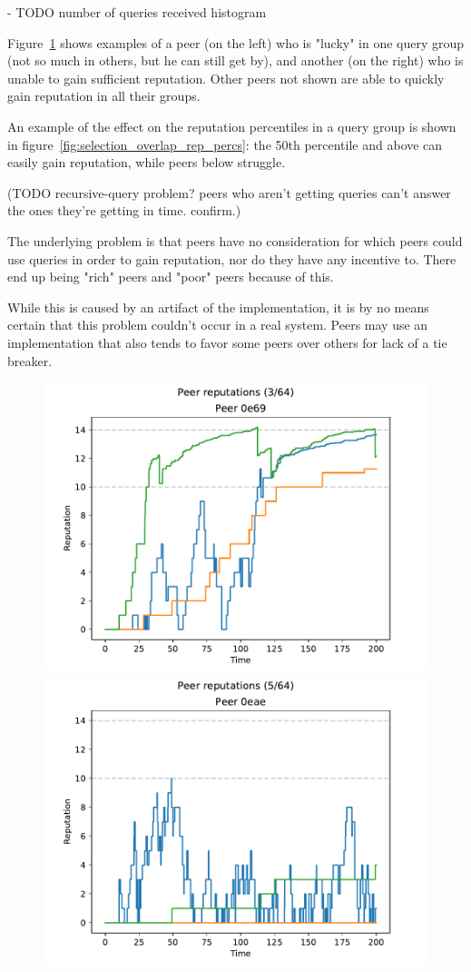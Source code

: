 - TODO number of queries received histogram

Figure~\ref{fig:selection_overlap_peer_reps} shows examples of a peer (on the
left) who is "lucky" in one query group (not so much in others, but he can still
get by), and another (on the right) who is unable to gain sufficient reputation.
Other peers not shown are able to quickly gain reputation in all their groups.

An example of the effect on the reputation percentiles in a query group is shown
in figure~\ref{fig:selection_overlap_rep_percs}: the 50th percentile and above
can easily gain reputation, while peers below struggle.

(TODO recursive-query problem? peers who aren't getting queries can't answer the
ones they're getting in time. confirm.)

The underlying problem is that peers have no consideration for which peers could
use queries in order to gain reputation, nor do they have any incentive to.
There end up being "rich" peers and "poor" peers because of this.

While this is caused by an artifact of the implementation, it is by no means
certain that this problem couldn't occur in a real system. Peers may use an
implementation that also tends to favor some peers over others for lack of a tie
breaker.

\begin{figure}[t]
\centering
\includegraphics[width=0.5\columnwidth]{figures/selection_overlap_peer_reps_3_of_64}%
\includegraphics[width=0.5\columnwidth]{figures/selection_overlap_peer_reps_5_of_64}
\label{fig:selection_overlap_peer_reps}
\end{figure}

